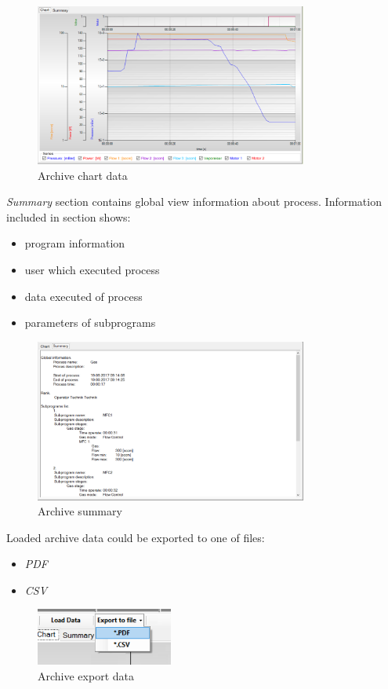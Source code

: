\begin{figure}[!h] 
	\centering \includegraphics[width=0.8\textwidth]{Graphic/Archive/Chart.png}	
	\caption{Archive chart data}
	\label{archive_chart_data}
	\end{figure}
	\FloatBarrier

\textit{Summary} section contains global view information about process. Information included in section shows:

\begin{itemize}
	\item program information
	\item user which executed process
	\item data executed of process
	\item parameters of subprograms
\end{itemize}

\begin{figure}[!h] 
	\centering \includegraphics[width=0.8\textwidth]{Graphic/Archive/Summary.png}	
	\caption{Archive summary}
	\label{archive_summary}
	\end{figure}
	\FloatBarrier

Loaded archive data could be exported to one of files:
\begin{itemize}
\item \textit{PDF} 
\item \textit{CSV}
\end{itemize} 

\begin{figure}[!h] 
	\centering \includegraphics[width=0.4\textwidth]{Graphic/Archive/Export.png}	
	\caption{Archive export data}
	\label{archive_export_data}
	\end{figure}
	\FloatBarrier
